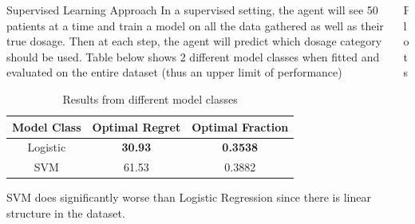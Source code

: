 \documentclass[final, 14pt]{beamer}
\newlength{\onecolwid}
\newlength{\twocolwid}
\begin{document}
\begin{frame}[t]
\begin{columns}[t]
\begin{column}{\twocolwid}
\begin{columns}[t,totalwidth=\twocolwid]
\begin{column}{\onecolwid} %


\begin{block}{Supervised Learning Approach}
In a supervised setting, the agent will see 50 patients at a time and train a model on all the data gathered as well as their true dosage. Then at each step, the agent will predict which dosage category should be used. Table below shows 2 different model classes when fitted and evaluated on the entire dataset (thus an upper limit of performance)

\vspace{.5in}
	
\begin{table}[h]
	\label{results2}
	\centering
	\begin{tabular}{ccc}
					\toprule
					Model Class         & Optimal Regret & Optimal Fraction\\
					\midrule
					Logistic & \textbf{30.93}          & \textbf{0.3538}  \\
					SVM                 & 61.53          & 0.3882 \\
					\bottomrule
	\end{tabular}
	\caption{Results from different model classes}
\end{table}

SVM does significantly worse than Logistic Regression since there is linear structure in the dataset.

\end{block}


\end{column} %

\begin{column}{\onecolwid} %


\begin{block}{Plots}


\end{block}
\end{column}
\end{columns}
\end{column}
\end{columns}
\end{frame}
\end{document}
